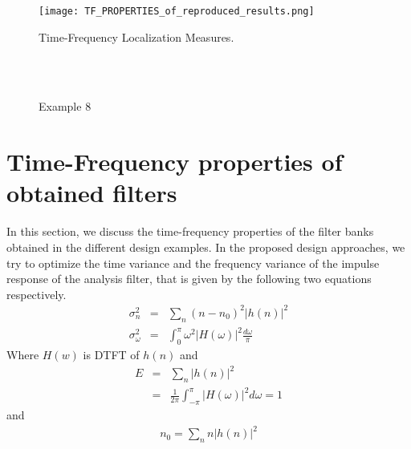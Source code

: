 \begin{figure}[tbh]
\centering{}\texttt{[image: TF\_PROPERTIES\_of\_reproduced\_results.png]}
\caption{\label{fig:TF_PROPERTIES_of_reproduced_results}Time-Frequency Localization Measures.}
\end{figure}

\begin{figure*}
\centering
{}\\
\\
%
\caption{Example 8}
\label{Example 8}
\end{figure*}

\clearpage
\section{Time-Frequency properties of obtained filters}
\label{sec: TFP of filters and wavelets}
In this section, we discuss the time-frequency properties of the filter banks obtained in the different design examples. In the proposed design approaches, we try to optimize the time variance and the frequency variance of the impulse response of the analysis filter, that is given by the following two equations respectively.
\begin{eqnarray*}
\sigma_n^2 &=& \sum_{n}(n-n_0)^2|h(n)|^2  \\
\sigma_\omega^2 &=& \int_{0}^{\pi}\omega^2|H(\omega)|^2 \frac{d\omega}{\pi}
\end{eqnarray*}
Where $H(w)$ is DTFT of $h(n)$ and
\begin{eqnarray*}
E &=& \sum_{n} |h(n)|^2 \\
  &=& \frac{1}{2\pi}\int_{-\pi}^{\pi} |H(\omega)|^2 d\omega = 1 
\end{eqnarray*}
and
\begin{eqnarray*}
n_0 = \sum_{n}n|h(n)|^2
\end{eqnarray*}

